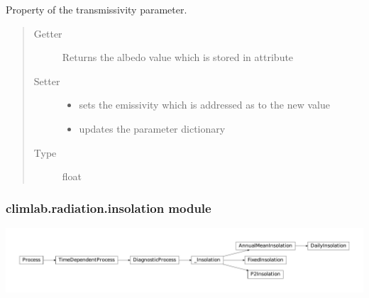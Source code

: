 \documentclass[a4paper,10pt,english]{sphinxmanual}
\begin{document}
\begin{fulllineitems}
\begin{fulllineitems}
\end{fulllineitems}


\begin{fulllineitems}
\label{api/climlab.radiation:climlab.radiation.Boltzmann.Boltzmann.tau}
Property of the transmissivity parameter.
\begin{quote}\begin{description}
\item[{Getter}] \leavevmode
Returns the albedo value which is stored in attribute 

\item[{Setter}] \leavevmode\begin{itemize}
\item {} 
sets the emissivity which is addressed as 
to the new value

\item {} 
updates the parameter dictionary 

\end{itemize}

\item[{Type}] \leavevmode
float

\end{description}\end{quote}

\end{fulllineitems}


\end{fulllineitems}



\subsubsection{climlab.radiation.insolation module}
\label{api/climlab.radiation:climlab-radiation-insolation-module}
\includegraphics{inheritance-2fabe0d6f5c260b023f1582e871aa6d6b64a2ba8.pdf}
\label{api/climlab.radiation:module-climlab.radiation.insolation}
\end{document}
